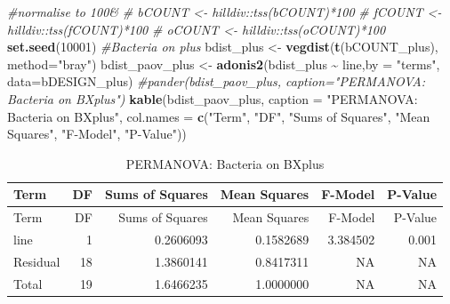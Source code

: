 \documentclass[
  11pt,
]{article}
\newenvironment{Shaded}{\begin{snugshade}}{\end{snugshade}}
\newcommand{\AttributeTok}[1]{\textcolor[rgb]{0.13,0.29,0.53}{#1}}
\newcommand{\CommentTok}[1]{\textcolor[rgb]{0.56,0.35,0.01}{\textit{#1}}}
\newcommand{\DecValTok}[1]{\textcolor[rgb]{0.00,0.00,0.81}{#1}}
\newcommand{\FunctionTok}[1]{\textcolor[rgb]{0.13,0.29,0.53}{\textbf{#1}}}
\newcommand{\NormalTok}[1]{#1}
\newcommand{\OtherTok}[1]{\textcolor[rgb]{0.56,0.35,0.01}{#1}}
\newcommand{\SpecialCharTok}[1]{\textcolor[rgb]{0.81,0.36,0.00}{\textbf{#1}}}
\newcommand{\StringTok}[1]{\textcolor[rgb]{0.31,0.60,0.02}{#1}}
\begin{document}
\begin{Shaded}
\begin{Highlighting}[]
\CommentTok{\#normalise to 100\&}
\CommentTok{\# bCOUNT \textless{}{-} hilldiv::tss(bCOUNT)*100}
\CommentTok{\# fCOUNT \textless{}{-} hilldiv::tss(fCOUNT)*100}
\CommentTok{\# oCOUNT \textless{}{-} hilldiv::tss(oCOUNT)*100}
\FunctionTok{set.seed}\NormalTok{(}\DecValTok{10001}\NormalTok{)}
\CommentTok{\#Bacteria on plus}
\NormalTok{bdist\_plus }\OtherTok{\textless{}{-}} \FunctionTok{vegdist}\NormalTok{(}\FunctionTok{t}\NormalTok{(bCOUNT\_plus), }\AttributeTok{method=}\StringTok{"bray"}\NormalTok{)}
\NormalTok{bdist\_paov\_plus }\OtherTok{\textless{}{-}} \FunctionTok{adonis2}\NormalTok{(bdist\_plus }\SpecialCharTok{\textasciitilde{}}\NormalTok{ line,}\AttributeTok{by =} \StringTok{"terms"}\NormalTok{, }\AttributeTok{data=}\NormalTok{bDESIGN\_plus)}
\CommentTok{\#pander(bdist\_paov\_plus, caption="PERMANOVA: Bacteria on BXplus")}
\FunctionTok{kable}\NormalTok{(bdist\_paov\_plus, }\AttributeTok{caption =} \StringTok{"PERMANOVA: Bacteria on BXplus"}\NormalTok{,}
      \AttributeTok{col.names =} \FunctionTok{c}\NormalTok{(}\StringTok{"Term"}\NormalTok{, }\StringTok{"DF"}\NormalTok{, }\StringTok{"Sums of Squares"}\NormalTok{, }\StringTok{"Mean Squares"}\NormalTok{, }\StringTok{"F{-}Model"}\NormalTok{, }\StringTok{"P{-}Value"}\NormalTok{))}
\end{Highlighting}
\end{Shaded}

\begin{longtable}[]{@{}lrrrrr@{}}
\caption{PERMANOVA: Bacteria on BXplus}\tabularnewline
\toprule\noalign{}
Term & DF & Sums of Squares & Mean Squares & F-Model & P-Value \\
\midrule\noalign{}
\endfirsthead
\toprule\noalign{}
Term & DF & Sums of Squares & Mean Squares & F-Model & P-Value \\
\midrule\noalign{}
\endhead
\bottomrule\noalign{}
\endlastfoot
line & 1 & 0.2606093 & 0.1582689 & 3.384502 & 0.001 \\
Residual & 18 & 1.3860141 & 0.8417311 & NA & NA \\
Total & 19 & 1.6466235 & 1.0000000 & NA & NA \\
\end{longtable}
\end{document}
